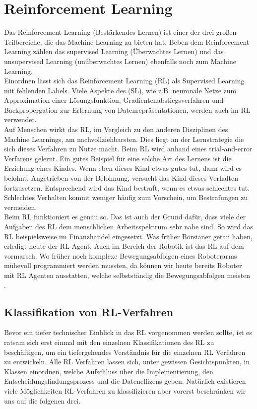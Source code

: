 \section{Reinforcement Learning}
Das Reinforcement Learning (Bestärkendes Lernen) ist einer der drei großen Teilbereiche, die das Machine Learning zu bieten hat. Beben dem Reinforcement Learning zählen das supervised Learning (Überwachtes Lernen) und das unsupervised Learning (unüberwachtes Lernen) ebenfalls noch zum Machine Learning.\\
Einordnen lässt sich das Reinforcement Learning (RL) als Supervised Learning mit fehlenden Labels. Viele Aspekte des (SL), wie z.B. neuronale Netze zum Approximation einer Lösungsfunktion, Gradientenabstiegsverfahren und Backpropergation zur Erlernung von Datenrepräsentationen, werden auch im RL verwendet.\\
Auf Menschen wirkt das RL, im Vergleich zu den anderen Disziplinen des Machine Learnings, am nachvollziehbarsten. Dies liegt an der Lernstrategie die sich dieses Verfahren zu Nutze macht. Beim RL wird anhand eines 
\grqq trial-and-error\glqq{} Verfarens gelernt. Ein gutes Beispiel für eine solche Art des Lernens ist die Erziehung eines Kindes. Wenn eben dieses Kind etwas gutes tut, dann wird es belohnt. Angetrieben von der Belohnung, versucht das Kind dieses Verhalten fortzusetzen. Entsprechend wird das Kind bestraft, wenn es etwas schlechtes tut. Schlechtes Verhalten kommt weniger häufig zum Vorschein, um Bestrafungen zu vermeiden.\\
Beim RL funktioniert es genau so. Das ist auch der Grund dafür, dass viele der Aufgaben des RL dem menschlichen Arbeitsspektrum sehr nahe sind. So wird das RL beispielsweise im Finanzhandel eingesetzt. Was früher Börsianer getan haben, erledigt heute der RL Agent. Auch im Bereich der Robotik ist das RL auf dem vormarsch. Wo früher noch komplexe Bewegungsabfolgen eines Roboterarms mühevoll programmiert werden mussten, da können wir heute bereits Roboter mit RL Agenten ausstatten, welche selbstständig die Bewegungsabfolgen meisten \cite{DRL}.

\subsection{Klassifikation von RL-Verfahren}
Bevor ein tiefer technischer Einblick in das RL vorgenommen werden sollte, ist es ratsam sich erst einmal mit den einzelnen Klassifikationen des RL zu beschäftigen, um ein tiefergehendes Verständnis für die einzelnen RL Verfahren zu entwickeln. Alle RL Verfahren lassen sich, unter gewissen Gesichtspunkten, in Klassen einordnen, welche Aufschluss über die Implementierung, den Entscheidungsfindungsprozess und die Dateneffizens geben. 
Natürlich existieren viele Möglichkeiten RL-Verfahren zu klassifizieren aber vorerst beschränken wir uns auf die folgenen drei.

